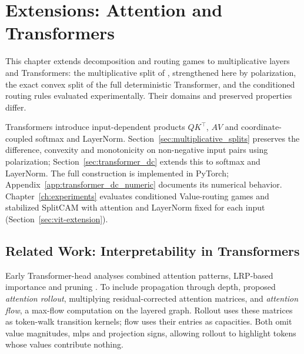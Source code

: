 \chapter{Extensions: Attention and Transformers}\label{ch:transformers}

This chapter extends decomposition and routing games to multiplicative layers and Transformers: the multiplicative split of \textcite{hiddenMono}, strengthened here by polarization, the exact convex split of the full deterministic Transformer, and the conditioned routing rules evaluated experimentally. Their domains and preserved properties differ.

Transformers \parencite{Vaswani2017} introduce input-dependent products $QK^\top$, $AV$ and coordinate-coupled softmax and LayerNorm. Section~\ref{sec:multiplicative_splits} preserves the difference, convexity and monotonicity on non-negative input pairs using polarization; Section~\ref{sec:transformer_dc} extends this to softmax and LayerNorm. The full construction is implemented in PyTorch; Appendix~\ref{app:transformer_dc_numeric} documents its numerical behavior. Chapter~\ref{ch:experiments} evaluates conditioned Value-routing games and stabilized SplitCAM with attention and LayerNorm fixed for each input (Section~\ref{sec:vit-extension}).

\section{Related Work: Interpretability in Transformers}\label{sec:related_work_transformers}

Early Transformer-head analyses combined attention patterns, LRP-based importance and pruning \parencite{Voita2019}. To include propagation through depth, \textcite{Abnar2020attention} proposed \emph{attention rollout}, multiplying residual-corrected attention matrices, and \emph{attention flow}, a max-flow computation on the layered graph. Rollout uses these matrices as token-walk transition kernels; flow uses their entries as capacities. Both omit value magnitudes, \acp{mlp} and projection signs, allowing rollout to highlight tokens whose values contribute nothing.

